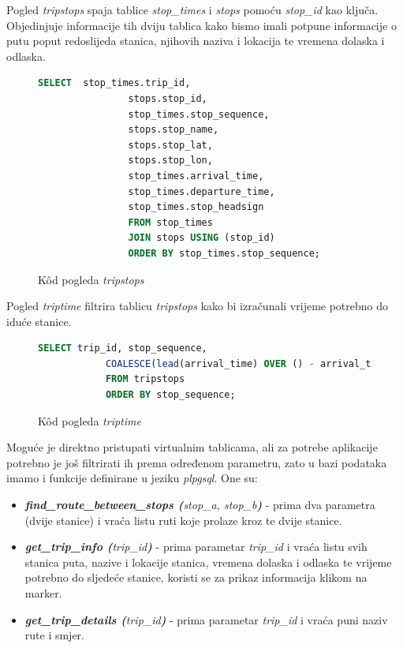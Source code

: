 \documentclass[zavrsnirad]{fer}
\begin{document}
Pogled \textit{tripstops} spaja tablice \textit{stop\_times} i \textit{stops} pomoću \textit{stop\_id} kao ključa. Objedinjuje informacije tih dviju tablica kako bismo imali potpune informacije o putu poput redoslijeda stanica, njihovih naziva i lokacija te vremena dolaska i odlaska.
\begin{figure}[h]
	\centering
	\begin{minipage}{0.8\linewidth}
		\begin{lstlisting}[language=SQL]
 		SELECT  stop_times.trip_id,
				stops.stop_id,
				stop_times.stop_sequence,
				stops.stop_name,
				stops.stop_lat,
				stops.stop_lon,
				stop_times.arrival_time,
				stop_times.departure_time,
				stop_times.stop_headsign
				FROM stop_times
				JOIN stops USING (stop_id)
				ORDER BY stop_times.stop_sequence;
		\end{lstlisting}
	\end{minipage}
	\caption{K\^od pogleda \textit{tripstops}}
	\label{slk:tripstops}
\end{figure}

Pogled \textit{triptime} filtrira tablicu \textit{tripstops} kako bi izračunali vrijeme potrebno do iduće stanice.
\begin{figure}[h]
	\centering
	\begin{minipage}{0.8\linewidth}
		\begin{lstlisting}[language=SQL]
			SELECT trip_id, stop_sequence,
			COALESCE(lead(arrival_time) OVER () - arrival_time, '00:00:00'::interval) AS time_till_next_stop
			FROM tripstops
			ORDER BY stop_sequence;
		\end{lstlisting}
	\end{minipage}
	\caption{K\^od pogleda \textit{triptime}}
	\label{slk:triptime}
\end{figure}

Moguće je direktno pristupati virtualnim tablicama, ali za potrebe aplikacije potrebno je još filtrirati ih prema određenom parametru, zato u bazi podataka imamo i funkcije definirane u jeziku\textit{ plpgsql}.
One su: 
\begin{itemize}
	\item \textit{\textbf{find\_route\_between\_stops (}stop\_a, stop\_b\textbf{)}} - prima dva parametra (dvije stanice) i vraća listu ruti koje prolaze kroz te dvije stanice.
	\item \textit{\textbf{get\_trip\_info (}trip\_id\textbf{)}} - prima parametar \textit{trip\_id} i vraća listu svih stanica puta, nazive i lokacije stanica, vremena dolaska i odlaska te vrijeme potrebno do sljedeće stanice, koristi se za prikaz informacija klikom na marker.
	\item \textit{\textbf{get\_trip\_details (}trip\_id\textbf{)}} - prima parametar \textit{trip\_id} i vraća puni naziv rute i smjer.
\end{itemize}
\end{document}
